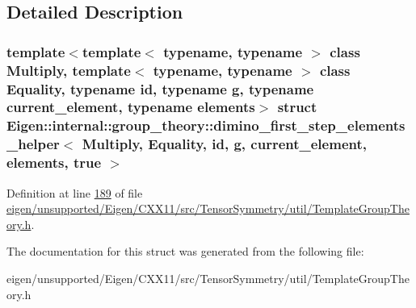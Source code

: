 \subsection{Detailed Description}
\subsubsection*{template$<$template$<$ typename, typename $>$ class Multiply, template$<$ typename, typename $>$ class Equality, typename id, typename g, typename current\+\_\+element, typename elements$>$\newline
struct Eigen\+::internal\+::group\+\_\+theory\+::dimino\+\_\+first\+\_\+step\+\_\+elements\+\_\+helper$<$ Multiply, Equality, id, g, current\+\_\+element, elements, true $>$}



Definition at line \hyperlink{eigen_2unsupported_2_eigen_2_c_x_x11_2src_2_tensor_symmetry_2util_2_template_group_theory_8h_source_l00189}{189} of file \hyperlink{eigen_2unsupported_2_eigen_2_c_x_x11_2src_2_tensor_symmetry_2util_2_template_group_theory_8h_source}{eigen/unsupported/\+Eigen/\+C\+X\+X11/src/\+Tensor\+Symmetry/util/\+Template\+Group\+Theory.\+h}.



The documentation for this struct was generated from the following file\+:\begin{DoxyCompactItemize}
\item 
eigen/unsupported/\+Eigen/\+C\+X\+X11/src/\+Tensor\+Symmetry/util/\+Template\+Group\+Theory.\+h\end{DoxyCompactItemize}
